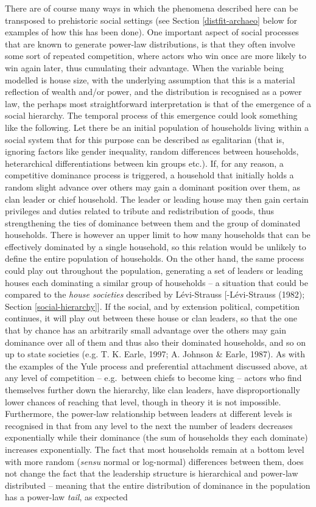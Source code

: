 \documentclass[
  12pt,
]{book}
\begin{document}
There are of course many ways in which the phenomena described here can be transposed to prehistoric social settings (see Section \ref{distfit-archaeo} below for examples of how this has been done). One important aspect of social processes that are known to generate power-law distributions, is that they often involve some sort of repeated competition, where actors who win once are more likely to win again later, thus cumulating their advantage. When the variable being modelled is house size, with the underlying assumption that this is a material reflection of wealth and/or power, and the distribution is recognised as a power law, the perhaps most straightforward interpretation is that of the emergence of a social hierarchy. The temporal process of this emergence could look something like the following. Let there be an initial population of households living within a social system that for this purpose can be described as egalitarian (that is, ignoring factors like gender inequality, random differences between households, heterarchical differentiations between kin groups etc.). If, for any reason, a competitive dominance process is triggered, a household that initially holds a random slight advance over others may gain a dominant position over them, as clan leader or chief household. The leader or leading house may then gain certain privileges and duties related to tribute and redistribution of goods, thus strengthening the ties of dominance between them and the group of dominated households. There is however an upper limit to how many households that can be effectively dominated by a single household, so this relation would be unlikely to define the entire population of households. On the other hand, the same process could play out throughout the population, generating a set of leaders or leading houses each dominating a similar group of households -- a situation that could be compared to the \emph{house societies} described by Lévi-Strauss {[}-Lévi-Strauss (1982); Section \ref{social-hierarchy}{]}. If the social, and by extension political, competition continues, it will play out between these house or clan leaders, so that the one that by chance has an arbitrarily small advantage over the others may gain dominance over all of them and thus also their dominated households, and so on up to state societies (e.g. T. K. Earle, 1997; A. Johnson \& Earle, 1987). As with the examples of the Yule process and preferential attachment discussed above, at any level of competition -- e.g.~between chiefs to become king -- actors who find themselves further down the hierarchy, like clan leaders, have disproportionally lower chances of reaching that level, though in theory it is not impossible. Furthermore, the power-law relationship between leaders at different levels is recognised in that from any level to the next the number of leaders decreases exponentially while their dominance (the sum of households they each dominate) increases exponentially. The fact that most households remain at a bottom level with more random (\emph{sensu} normal or log-normal) differences between them, does not change the fact that the leadership structure is hierarchical and power-law distributed -- meaning that the entire distribution of dominance in the population has a power-law \emph{tail}, as expected 
\end{document}
